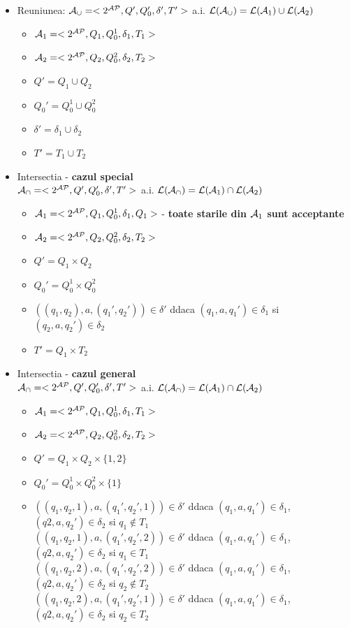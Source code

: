 \documentclass[10pt,a4paper,twocolumn]{report}
\begin{document}
\begin{itemize}
	\item Reuniunea: $\mathcal{A}_\cup = <2^{\mathcal{AP}}, Q', Q_0', \delta', T'>$ a.i. $\mathcal{L}(\mathcal{A}_\cup) = \mathcal{L}(\mathcal{A}_1) \cup \mathcal{L}(\mathcal{A}_2)$
	\begin{itemize}
		\item $\mathcal{A}_1 = <2^{\mathcal{AP}}, Q_1, Q_0^1, \delta_1, T_1>$
		\item $\mathcal{A}_2 = <2^{\mathcal{AP}}, Q_2, Q_0^2, \delta_2, T_2>$
		\item $Q' = Q_1 \cup Q_2$
		\item $Q_0' = Q_0^1 \cup Q_0^2$
		\item $\delta' = \delta_1 \cup \delta_2$
		\item $T' = T_1 \cup T_2$
	\end{itemize}
	\item Intersectia - \textbf{cazul special}\\$\mathcal{A}_\cap = <2^{\mathcal{AP}}, Q', Q_0', \delta', T'>$ a.i. $\mathcal{L}(\mathcal{A}_\cap) = \mathcal{L}(\mathcal{A}_1) \cap \mathcal{L}(\mathcal{A}_2)$
	\begin{itemize}
		\item $\mathcal{A}_1 = <2^{\mathcal{AP}}, Q_1, Q_0^1, \delta_1, Q_1>$ - \textbf{toate starile din $\mathcal{A}_1$ sunt acceptante}
		\item $\mathcal{A}_2 = <2^{\mathcal{AP}}, Q_2, Q_0^2, \delta_2, T_2>$
		\item $Q' = Q_1 \times Q_2$
		\item $Q_0' = Q_0^1 \times Q_0^2$
		\item $((q_1, q_2), a, (q_1', q_2')) \in \delta'$ ddaca $(q_1, a, q_1') \in \delta_1$ si $(q_2, a, q_2') \in \delta_2$
		\item $T' = Q_1 \times T_2$
	\end{itemize}
	\item Intersectia - \textbf{cazul general}\\$\mathcal{A}_\cap=<2^{\mathcal{AP}}, Q', Q_0', \delta', T'>$ a.i. $\mathcal{L}(\mathcal{A}_\cap) = \mathcal{L}(\mathcal{A}_1) \cap \mathcal{L}(\mathcal{A}_2)$
	\begin{itemize}
		\item $\mathcal{A}_1 = <2^{\mathcal{AP}}, Q_1, Q_0^1, \delta_1, T_1>$ 
		\item $\mathcal{A}_2 = <2^{\mathcal{AP}}, Q_2, Q_0^2, \delta_2, T_2>$
		\item $Q' = Q_1 \times Q_2 \times\{1,2\}$
		\item $Q_0' = Q_0^1 \times Q_0^2 \times \{1\}$
		\item $((q_1 , q_2 , 1), a, (q_1' , q_2' , 1)) \in \delta'$ ddaca $(q_1 , a, q_1' ) \in \delta_1$, $(q2 , a, q_2') \in \delta_2$ si $q_1 \not \in T_1$\\
		$((q_1 , q_2 , 1), a, (q_1' , q_2' , 2)) \in \delta'$ ddaca $(q_1 , a, q_1' ) \in \delta_1$, $(q2 , a, q_2') \in \delta_2$ si $q_1 \in T_1$\\
		$((q_1 , q_2 , 2), a, (q_1' , q_2' , 2)) \in \delta'$ ddaca $(q_1 , a, q_1' ) \in \delta_1$, $(q2 , a, q_2') \in \delta_2$ si $q_2 \not \in T_2$\\
		$((q_1 , q_2 , 2), a, (q_1' , q_2' , 1)) \in \delta'$ ddaca $(q_1 , a, q_1' ) \in \delta_1$, $(q2 , a, q_2') \in \delta_2$ si $q_2 \in T_2$
		

\end{itemize}
\end{itemize}
\end{document}
